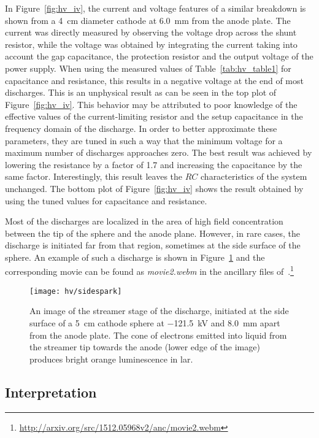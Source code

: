 In Figure~\ref{fig:hv_iv}, the current and voltage features of a similar breakdown is shown from a \SI{4}{\centi\metre} diameter cathode at \SI{6.0}{\milli\metre} from the anode plate.
The current was directly measured by observing the voltage drop across the shunt resistor, while the voltage was obtained by integrating the current taking into account the gap capacitance, the protection resistor and the output voltage of the power supply.
When using the measured values of Table~\ref{tab:hv_table1} for capacitance and resistance, this results in a negative voltage at the end of most discharges.
This is an unphysical result as can be seen in the top plot of Figure~\ref{fig:hv_iv}.
This behavior may be attributed to poor knowledge of the effective values of the current-limiting resistor and the setup capacitance in the frequency domain of the discharge.
In order to better approximate these parameters, they are tuned in such a way that the minimum voltage for a maximum number of discharges approaches zero.
The best result was achieved by lowering the resistance by a factor of 1.7 and increasing the capacitance by the same factor.
Interestingly, this result leaves the $RC$ characteristics of the system unchanged.
The bottom plot of Figure~\ref{fig:hv_iv} shows the result obtained by using the tuned values for capacitance and resistance.

Most of the discharges are localized in the area of high field concentration between the tip of the sphere and the anode plane.
However, in rare cases, the discharge is initiated far from that region, sometimes at the side surface of the sphere.
An example of such a discharge is shown in Figure~\ref{fig:hv_side} and the corresponding movie can be found as \emph{movie2.webm} in the ancillary files of~\cite{breakdown_16}.\footnote{\url{http://arxiv.org/src/1512.05968v2/anc/movie2.webm}}

\begin{figure}[htb]
	\centering	
	\texttt{[image: hv/sidespark]}
	\caption[ test streamer image]{
		An image of the streamer stage of the discharge, initiated at the side surface of a \SI{5}{\centi\metre} cathode sphere at \SI{-121.5}{\kilo\volt} and \SI{8.0}{\milli\metre} apart from the anode plate.
		The cone of electrons emitted into liquid from the streamer tip towards the anode (lower edge of the image) produces bright orange luminescence in \acrshort{lar}.
	}
	\label{fig:hv_side}
\end{figure}


\subsection{Interpretation}
\label{sec:studies_hv_interpretation}

